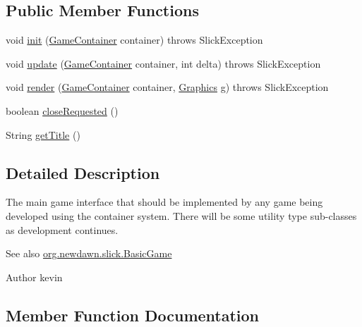 \subsection*{Public Member Functions}
\begin{DoxyCompactItemize}
\item 
void \mbox{\hyperlink{interfaceorg_1_1newdawn_1_1slick_1_1_game_ad2dd6affab08bb8fdb5fab0815957b7a}{init}} (\mbox{\hyperlink{classorg_1_1newdawn_1_1slick_1_1_game_container}{Game\+Container}} container)  throws Slick\+Exception
\item 
void \mbox{\hyperlink{interfaceorg_1_1newdawn_1_1slick_1_1_game_ab07b2e9463ee4631620dde0de25bdee8}{update}} (\mbox{\hyperlink{classorg_1_1newdawn_1_1slick_1_1_game_container}{Game\+Container}} container, int delta)  throws Slick\+Exception
\item 
void \mbox{\hyperlink{interfaceorg_1_1newdawn_1_1slick_1_1_game_af1a4670d43eb3ba04dfcf55ab1975b64}{render}} (\mbox{\hyperlink{classorg_1_1newdawn_1_1slick_1_1_game_container}{Game\+Container}} container, \mbox{\hyperlink{classorg_1_1newdawn_1_1slick_1_1_graphics}{Graphics}} g)  throws Slick\+Exception
\item 
boolean \mbox{\hyperlink{interfaceorg_1_1newdawn_1_1slick_1_1_game_a186989e6f05f917447c004adfe2f2332}{close\+Requested}} ()
\item 
String \mbox{\hyperlink{interfaceorg_1_1newdawn_1_1slick_1_1_game_ae02a95991618c4aec2038d8d482be0d2}{get\+Title}} ()
\end{DoxyCompactItemize}


\subsection{Detailed Description}
The main game interface that should be implemented by any game being developed using the container system. There will be some utility type sub-\/classes as development continues.

\begin{DoxySeeAlso}{See also}
\mbox{\hyperlink{classorg_1_1newdawn_1_1slick_1_1_basic_game}{org.\+newdawn.\+slick.\+Basic\+Game}}
\end{DoxySeeAlso}
\begin{DoxyAuthor}{Author}
kevin 
\end{DoxyAuthor}


\subsection{Member Function Documentation}
\mbox{\label{interfaceorg_1_1newdawn_1_1slick_1_1_game_a186989e6f05f917447c004adfe2f2332}} 
